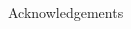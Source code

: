 \documentclass[final]{beamer}
\newcounter{acolumn}%
\def\autoheight{\vspace*{0pt}}%
\begin{document}
\begin{frame}
\begin{acolumns}[t]
\begin{column}{.24\linewidth}
\begin{block}{Acknowledgements}
           \autoheight   
          \end{block}
                              
         \end{column}
        
        
        \end{acolumns}
    
    \vfill 
  \end{frame}
\end{document}
